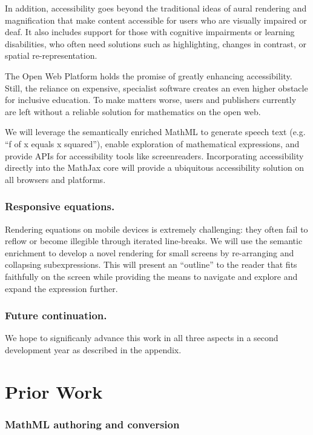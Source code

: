 \documentclass[12pt]{amsart}
\begin{document}
In addition, accessibility goes beyond the traditional ideas of aural
rendering and magnification that make content 
accessible for users who are visually impaired or deaf. It also includes 
support for those with cognitive impairments or learning disabilities, who
often need solutions such as 
highlighting, changes in contrast, or spatial re-representation.

The Open Web Platform holds the promise of greatly enhancing accessibility. 
Still, the reliance on expensive, specialist software creates an even higher 
obstacle for inclusive education. To make matters worse, users and publishers 
currently are left without a reliable solution for mathematics on the open web.

We will leverage the semantically enriched MathML to generate speech text (e.g. 
``f of x equals x squared''), enable exploration of mathematical expressions, 
and provide APIs for accessibility tools like screenreaders. Incorporating 
accessibility directly into the MathJax core will provide a ubiquitous 
accessibility solution on all browsers and platforms.

\subsubsection*{Responsive equations.}

Rendering equations on mobile devices is extremely challenging: they often 
fail to reflow or become illegible through iterated line-breaks. We will 
use the semantic enrichment to develop a novel rendering for small screens by 
re-arranging and collapsing subexpressions. This will present an ``outline'' to the 
reader that fits faithfully on the screen while providing the means to navigate 
and explore and expand the expression further.

\subsubsection*{Future continuation.} We hope to significanly advance this 
work in all three aspects in a second development year as described in the 
appendix.

\section{Prior Work}

\subsubsection*{MathML authoring and conversion}
\end{document}

